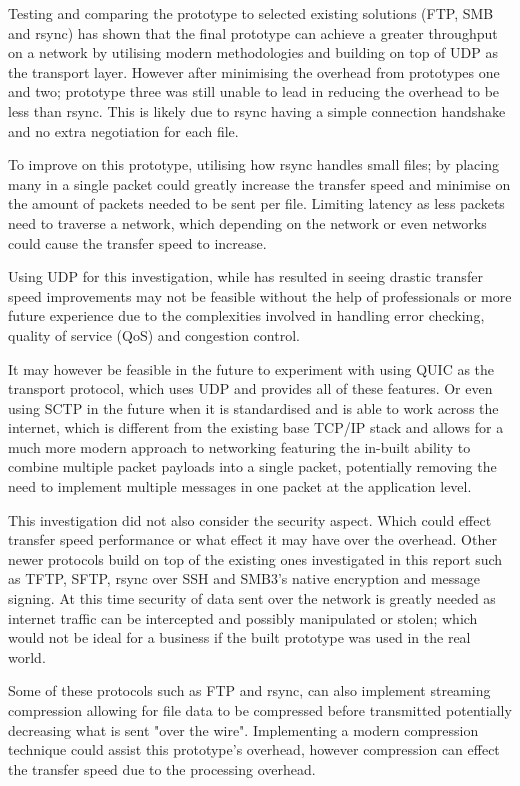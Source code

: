 Testing and comparing the prototype to selected existing solutions (FTP, SMB and rsync) has shown that the final prototype can achieve a greater throughput on a network by utilising modern methodologies and building on top of UDP as the transport layer. However after minimising the overhead from prototypes one and two; prototype three was still unable to lead in reducing the overhead to be less than rsync. This is likely due to rsync having a simple connection handshake and no extra negotiation for each file.

To improve on this prototype, utilising how rsync handles small files; by placing many in a single packet could greatly increase the transfer speed and minimise on the amount of packets needed to be sent per file. Limiting latency as less packets need to traverse a network, which depending on the network or even networks could cause the transfer speed to increase.

Using UDP for this investigation, while has resulted in seeing drastic transfer speed improvements may not be feasible without the help of professionals or more future experience due to the complexities involved in handling error checking, quality of service (QoS) and congestion control.

It may however be feasible in the future to experiment with using QUIC as the transport protocol, which uses UDP and provides all of these features. Or even using SCTP in the future when it is standardised and is able to work across the internet, which is different from the existing base TCP/IP stack and allows for a much more modern approach to networking featuring the in-built ability to combine multiple packet payloads into a single packet, potentially removing the need to implement multiple messages in one packet at the application level.

This investigation did not also consider the security aspect. Which could effect transfer speed performance or what effect it may have over the overhead. Other newer protocols build on top of the existing ones investigated in this report such as TFTP, SFTP, rsync over SSH and SMB3's native encryption and message signing. At this time security of data sent over the network is greatly needed as internet traffic can be intercepted and possibly manipulated or stolen; which would not be ideal for a business if the built prototype was used in the real world.

Some of these protocols such as FTP and rsync, can also implement streaming compression allowing for file data to be compressed before transmitted potentially decreasing what is sent "over the wire". Implementing a modern compression technique could assist this prototype's overhead, however compression can effect the transfer speed due to the processing overhead.

